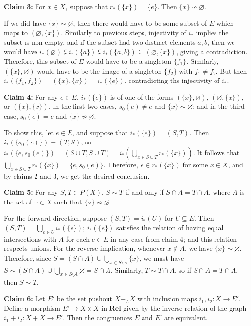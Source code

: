 \documentclass[a4paper,12pt,reqno]{amsart}
\begin{document}
{\bf Claim 3:} For $x\in X$, suppose that $r_*(\{ x \}) = \{ e \}$.  Then $\{ x \} \not\sim \varnothing$.

If we did have $\{ x \} \sim \varnothing$, then there would have to be some subset of $E$ which maps to $(\varnothing, \{ x \})$.  Similarly to previous steps, injectivity of $i_*$ implies the subset is non-empty, and if the subset had two distinct elements $a,b$, then we would have $i_*(\varnothing) \subsetneqq i_*(\{a\}) \subsetneqq i_*(\{a,b\}) \subseteq (\varnothing, \{ x \})$, giving a contradiction.  Therefore, this subset of $E$ would have to be a singleton $\{ f_1 \}$.  Similarly, $(\{ x \}, \varnothing)$ would have to be the image of a singleton $\{ f_2 \}$ with $f_1 \ne f_2$.  But then $i_*(\{ f_1, f_2 \}) = (\{ x \}, \{ x \}) = i_*(\{ e \})$, contradicting the injectivity of $i_*$.

{\bf Claim 4:} For any $e \in E$, $i_*(\{ e \})$ is of one of the forms $(\{ x \}, \varnothing)$, $(\varnothing, \{ x \})$, or $(\{ x \}, \{ x \})$.  In the first two cases, $s_0(e) \ne e$ and $\{ x \} \sim \varnothing$; and in the third case, $s_0(e) = e$ and $\{ x \} \not\sim \varnothing$.

To show this, let $e\in E$, and suppose that $i_*(\{ e \}) = (S, T)$.  Then $i_*(\{ s_0(e) \}) = (T, S)$, so $i_*(\{ e, s_0(e) \}) = (S \cup T, S\cup T) = i_*(\bigcup_{x\in S\cup T} r_*(\{ x \}))$.  It follows that $\bigcup_{x\in S\cup T} r_*(\{ x \}) = \{ e, s_0(e) \}$.  Therefore, $e \in r_*(\{ x \})$ for some $x \in X$, and by claims 2 and 3, we get the desired conclusion.

{\bf Claim 5:} For any $S, T \in P(X)$, $S \sim T$ if and only if $S\cap A = T\cap A$, where $A$ is the set of $x\in X$ such that $\{ x \} \not\sim \varnothing$.

For the forward direction, suppose $(S, T) = i_*(U)$ for $U \subseteq E$.  Then $(S, T) = \bigcup_{e\in U} i_*(\{ e \})$; $i_*(\{ e \})$ satisfies the relation of having equal intersections with $A$ for each $e\in E$ in any case from claim 4; and this relation respects unions.  For the reverse implication, whenever $x\notin A$, we have $\{ x \} \sim \varnothing$.  Therefore, since $S = (S \cap A) \cup \bigcup_{x\in S \setminus A} \{ x \}$, we must have $S \sim (S \cap A) \cup \bigcup_{x\in S \setminus A} \varnothing = S \cap A$.  Similarly, $T \sim T \cap A$, so if $S\cap A = T\cap A$, then $S \sim T$.

{\bf Claim 6:} Let $E'$ be the set pushout $X +_A X$ with inclusion maps $i_1, i_2 : X \to E'$. Define a morphism $E' \to X \times X$ in $\mathbf{Rel}$ given by the inverse relation of the graph $i_1 + i_2 : X + X \to E'$. Then the congruences $E$ and $E'$ are equivalent.
\end{document}
